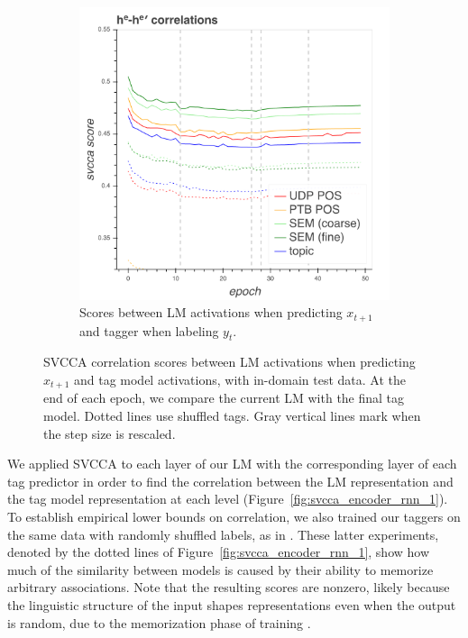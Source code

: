 \begin{figure}
\begin{subfigure}{.48\textwidth}
    \includegraphics[width=\textwidth]{svcca/input_cca_encoder.png}
    \caption{Scores between LM activations when predicting $x_{t+1}$ and tagger when labeling $y_t$.}
    \label{fig:input_cca}
\end{subfigure}
\caption{SVCCA correlation scores between LM activations when predicting $x_{t+1}$ and tag model activations, with in-domain test data. At the end of each epoch, we compare the current LM with the final tag model. Dotted lines use shuffled tags. Gray vertical lines mark when the step size is rescaled.}
\end{figure}

We applied SVCCA to each layer of our LM with the corresponding layer of each tag predictor in order to find the correlation between the LM representation and the tag model representation at each level (Figure~\ref{fig:svcca_encoder_rnn_1}).
To establish empirical lower bounds on correlation, we also trained our taggers on the same data with randomly shuffled labels, as in \citeauthor{zhang_understanding_2016}. These latter experiments, denoted by the dotted lines of Figure~\ref{fig:svcca_encoder_rnn_1}, show how much of the similarity between models is caused by their ability to memorize arbitrary associations. Note that the resulting scores are  nonzero, likely because the linguistic structure of the input shapes representations even when the output is random, due to the memorization phase of training \cite{shwartz-ziv_opening_2017}.

